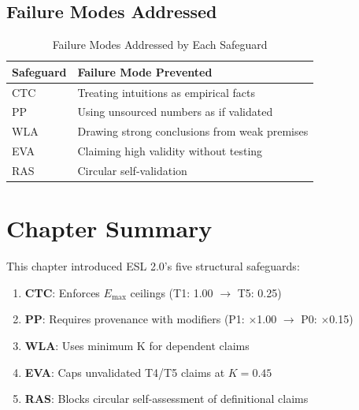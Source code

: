 \documentclass[11pt,a4paper]{article}
\theoremstyle{remark}
\begin{document}
\subsection{Failure Modes Addressed}

\begin{table}[h]
\centering
\caption{Failure Modes Addressed by Each Safeguard}
\label{tab:failure-modes}
\begin{tabular}{lp{7cm}}
\toprule
\textbf{Safeguard} & \textbf{Failure Mode Prevented} \\
\midrule
CTC & Treating intuitions as empirical facts \\
PP & Using unsourced numbers as if validated \\
WLA & Drawing strong conclusions from weak premises \\
EVA & Claiming high validity without testing \\
RAS & Circular self-validation \\
\bottomrule
\end{tabular}
\end{table}


\section{Chapter Summary}
\label{sec:summary}

This chapter introduced ESL 2.0's five structural safeguards:

\begin{enumerate}
    \item \textbf{CTC}: Enforces $E_{\max}$ ceilings (T1: 1.00 $\to$ T5: 0.25)

    \item \textbf{PP}: Requires provenance with modifiers (P1: $\times$1.00 $\to$ P0: $\times$0.15)

    \item \textbf{WLA}: Uses minimum K for dependent claims

    \item \textbf{EVA}: Caps unvalidated T4/T5 claims at $K = 0.45$

    \item \textbf{RAS}: Blocks circular self-assessment of definitional claims
\end{enumerate}
\end{document}
